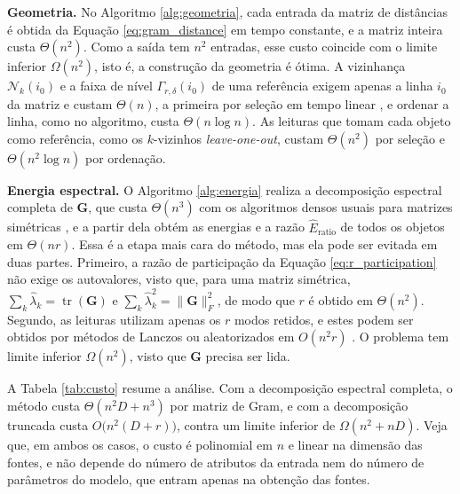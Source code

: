 \textbf{Geometria.} No Algoritmo \ref{alg:geometria}, cada entrada da matriz de distâncias é obtida da Equação \eqref{eq:gram_distance} em tempo constante, e a matriz inteira custa $\Theta(n^2)$. Como a saída tem $n^2$ entradas, esse custo coincide com o limite inferior $\Omega(n^2)$, isto é, a construção da geometria é ótima. A vizinhança $\mathcal{N}_k(i_0)$ e a faixa de nível $\Gamma_{r,\delta}(i_0)$ de uma referência exigem apenas a linha $i_0$ da matriz e custam $\Theta(n)$, a primeira por seleção em tempo linear \citep{Cormen2009}, e ordenar a linha, como no algoritmo, custa $\Theta(n \log n)$. As leituras que tomam cada objeto como referência, como os $k$-vizinhos \textit{leave-one-out}, custam $\Theta(n^2)$ por seleção e $\Theta(n^2 \log n)$ por ordenação.

\textbf{Energia espectral.} O Algoritmo \ref{alg:energia} realiza a decomposição espectral completa de $\mathbf{G}$, que custa $\Theta(n^3)$ com os algoritmos densos usuais para matrizes simétricas \citep{GolubVanLoan2013}, e a partir dela obtém as energias e a razão $\widehat{E}_{\mathrm{ratio}}$ de todos os objetos em $\Theta(nr)$. Essa é a etapa mais cara do método, mas ela pode ser evitada em duas partes. Primeiro, a razão de participação da Equação \eqref{eq:r_participation} não exige os autovalores, visto que, para uma matriz simétrica, $\sum_k \hat\lambda_k = \operatorname{tr}(\mathbf{G})$ e $\sum_k \hat\lambda_k^2 = \|\mathbf{G}\|_F^2$, de modo que $r$ é obtido em $\Theta(n^2)$. Segundo, as leituras utilizam apenas os $r$ modos retidos, e estes podem ser obtidos por métodos de Lanczos ou aleatorizados em $O(n^2 r)$ \citep{Halko2011}. O problema tem limite inferior $\Omega(n^2)$, visto que $\mathbf{G}$ precisa ser lida.

A Tabela \ref{tab:custo} resume a análise. Com a decomposição espectral completa, o método custa $\Theta(n^2 D + n^3)$ por matriz de Gram, e com a decomposição truncada custa $O\bigl(n^2 (D + r)\bigr)$, contra um limite inferior de $\Omega(n^2 + nD)$. Veja que, em ambos os casos, o custo é polinomial em $n$ e linear na dimensão das fontes, e não depende do número de atributos da entrada nem do número de parâmetros do modelo, que entram apenas na obtenção das fontes.


